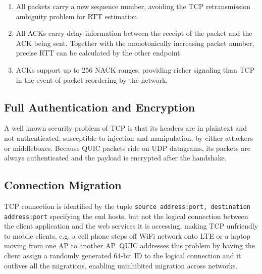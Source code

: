 \documentclass{sig-alternate-05-2015}
\begin{document}
\begin{enumerate}
	\itemsep0em
	\item All packets carry a new sequence number, avoiding the TCP retransmission ambiguity problem for RTT estimation.
	\item All ACKs carry delay information between the receipt of the packet and the ACK being sent. Together with the monotonically increasing packet number, precise RTT can be calculated by the other endpoint.
	\item ACKs support up to 256 NACK ranges, providing richer signaling than TCP in the event of packet reordering by the network.
\end{enumerate}

\subsection{Full Authentication and Encryption}
A well known security problem of TCP is that its headers are in plaintext and not authenticated, susecptible to injection and manipulation, by either attackers or middleboxes. Because QUIC packets ride on UDP datagrams, its packets are always authenticated and the payload is encrypted after the handshake. \cite{quic:draft}

\subsection{Connection Migration}
TCP connection is identified by the tuple \texttt{source address:port, destination address:port} specifying the end hosts, but not the logical connection between the client application and the web services it is accessing, making TCP unfriendly to mobile clients, e.g. a cell phone steps off WiFi network onto LTE or a laptop moving from one AP to another AP. QUIC addresses this problem by having the client assign a randomly generated 64-bit ID to the logical connection and it outlives all the migrations, enabling uninhibited migration across networks. \cite{quic:draft}
\end{document}
